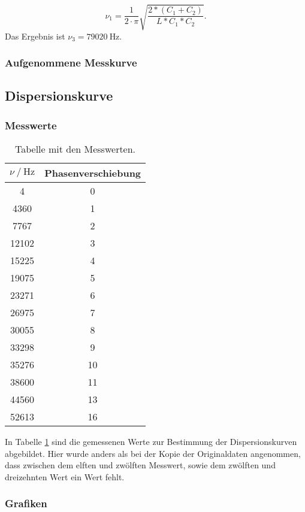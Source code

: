 \begin{equation}
  \nu_1 = \frac{1}{2\cdot\pi}\sqrt{\frac{2*(C_1+C_2)}{L*C_1*C_2}}.
\end{equation}
Das Ergebnis ist $\nu_3 = \SI{79020}{\hertz}$.

\subsubsection{Aufgenommene Messkurve}


\subsection{Dispersionskurve}

\subsubsection{Messwerte}

\begin{table}
  \centering
  \caption{Tabelle mit den Messwerten.}
  \label{tab:wertedis}
  \begin{tabular}{c c}
    \toprule
     $\nu \ /\ \si{\hertz}$ & Phasenverschiebung\\
    \midrule
    4 & 0\\
    4360 & 1\\
    7767 & 2\\
    12102 & 3\\
    15225 & 4\\
    19075 & 5\\
    23271 & 6\\
    26975 & 7\\
    30055 & 8\\
    33298 & 9\\
    35276 & 10\\
    38600 & 11\\
    44560 & 13\\
    52613 & 16\\
    \bottomrule
  \end{tabular}
\end{table}

In Tabelle \ref{tab:wertedis} sind die gemessenen Werte zur Bestimmung der
Dispersionskurven abgebildet. Hier wurde anders als bei der Kopie der
Originaldaten angenommen, dass zwischen dem elften und zwölften Messwert,
sowie dem zwölften und dreizehnten Wert ein Wert fehlt.

\subsubsection{Grafiken}

